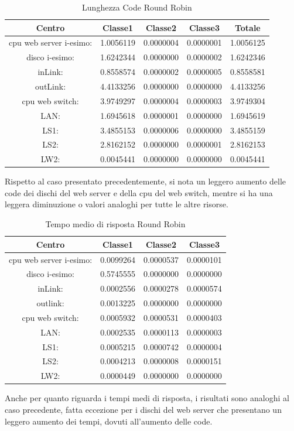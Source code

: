 \begin{table}[H]
\begin{center}
\begin{tabular}{||c|c|c|c|c||}
\hline
Centro &Classe1 &Classe2 &Classe3 &Totale\\
\hline
\hline
 cpu web server i-esimo: 	&1.0056119	&0.0000004	&0.0000001	&1.0056125\\
\hline
 disco i-esimo: 	&1.6242344	&0.0000000	&0.0000002	&1.6242346\\
\hline
 inLink: 	&0.8558574	&0.0000002	&0.0000005	&0.8558581\\
\hline
 outLink: 	&4.4133256	&0.0000000	&0.0000000	&4.4133256\\
\hline
 cpu web switch: 	&3.9749297	&0.0000004	&0.0000003	&3.9749304\\
\hline
 LAN: 	&1.6945618	&0.0000001	&0.0000000	&1.6945619\\
\hline
 LS1: 	&3.4855153	&0.0000006	&0.0000000	&3.4855159\\
\hline
 LS2: 	&2.8162152	&0.0000000	&0.0000001	&2.8162153\\
\hline
 LW2: 	&0.0045441	&0.0000000	&0.0000000	&0.0045441\\
\hline
\end{tabular}
\end{center}
\caption{Lunghezza Code Round Robin}
\label{lunghezzacode}
\end{table}
Rispetto al caso presentato precedentemente, si nota un leggero aumento delle code dei dischi del web server e della cpu del web switch, mentre si ha una leggera diminuzione o valori analoghi per tutte le altre risorse.
\begin{table}[H]
\begin{center}
\begin{tabular}{||c|c|c|c||}
\hline
Centro &Classe1 &Classe2 &Classe3\\
\hline
\hline
 cpu web server i-esimo: 	&0.0099264	&0.0000537	&0.0000101\\
\hline
 disco i-esimo: 	&0.5745555	&0.0000000	&0.0000000\\
\hline
 inLink: 	&0.0002556	&0.0000278	&0.0000574\\
\hline
 outlink: 	&0.0013225	&0.0000000	&0.0000000\\
\hline
 cpu web switch: 	&0.0005932	&0.0000531	&0.0000403\\
\hline
 LAN: 	&0.0002535	&0.0000113	&0.0000003\\
\hline
 LS1: 	&0.0005215	&0.0000742	&0.0000004\\
\hline
 LS2: 	&0.0004213	&0.0000008	&0.0000151\\
\hline
 LW2: 	&0.0000449	&0.0000000	&0.0000000\\
\hline
\end{tabular}
\end{center}
\caption{Tempo medio di risposta Round Robin}
\label{tempomediorisposta}
\end{table}
Anche per quanto riguarda i tempi medi di risposta, i risultati sono analoghi al caso precedente, fatta eccezione per i dischi del web server che presentano un leggero aumento dei tempi, dovuti all'aumento delle code.
